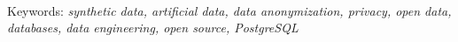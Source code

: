 \lipsum[3-5] \\
\newline
Keywords: \textit{synthetic data, artificial data, data anonymization, privacy, open data, databases, data engineering, open source, PostgreSQL}